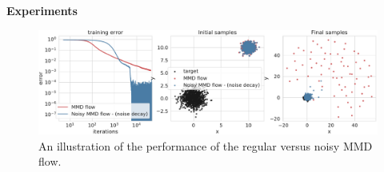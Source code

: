 











%
%
%
% 
%
%
%
\textbf{Experiments}


\begin{figure}[ht]
	\centering
	\includegraphics[width=0.8\linewidth]{figures/Gaussians_error_4}
	\caption{An illustration of the performance of the regular versus noisy MMD flow.}
	\label{fig:experiments}
\end{figure}

